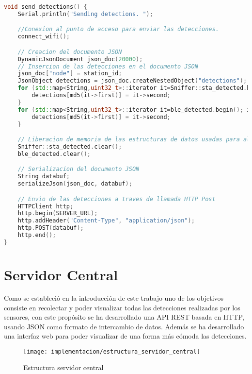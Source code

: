 \documentclass[../proyecto.tex]{subfiles}
\begin{document}
\begin{lstlisting}[language=C++, caption=Envío de detecciones al servidor central , captionpos=b, frame=single, label={lst:envio_detecciones}]
void send_detections() {
    Serial.println("Sending detections. ");

    //Conexion al punto de acceso para enviar las detecciones.
    connect_wifi();

    // Creacion del documento JSON
    DynamicJsonDocument json_doc(20000);
    // Insercion de las detecciones en el documento JSON
    json_doc["node"] = station_id;
    JsonObject detections = json_doc.createNestedObject("detections");
    for (std::map<String,uint32_t>::iterator it=Sniffer::sta_detected.begin(); it!=Sniffer::sta_detected.end(); ++it) {
        detections[md5(it->first)] = it->second;
    }
    for (std::map<String,uint32_t>::iterator it=ble_detected.begin(); it!=ble_detected.end(); ++it) {
        detections[md5(it->first)] = it->second;
    }

    // Liberacion de memoria de las estructuras de datos usadas para almacenar las detecciones.
    Sniffer::sta_detected.clear();
    ble_detected.clear();

    // Serializacion del documento JSON
    String databuf;
    serializeJson(json_doc, databuf);

    // Envio de las detecciones a traves de llamada HTTP Post
    HTTPClient http;
    http.begin(SERVER_URL);
    http.addHeader("Content-Type", "application/json");
    http.POST(databuf);
    http.end();
}
\end{lstlisting}

\section{Servidor Central}\label{sect:impementacion_servidor_central}

Como se estableció en la introducción de este trabajo uno de los objetivos consiste en recolectar y poder visualizar todas las detecciones realizadas por los sensores, con este propósito se ha desarrollado una API REST basada en HTTP, usando JSON como formato de intercambio de datos. Además se ha desarrollado una interfaz web para poder visualizar de una forma más cómoda las detecciones.\\

\begin{figure}[H]
\centering
\texttt{[image: implementacion/estructura\_servidor\_central]}
\caption{Estructura servidor central }
\label{fig:estructura_servidor_central}
\end{figure}
\end{document}
